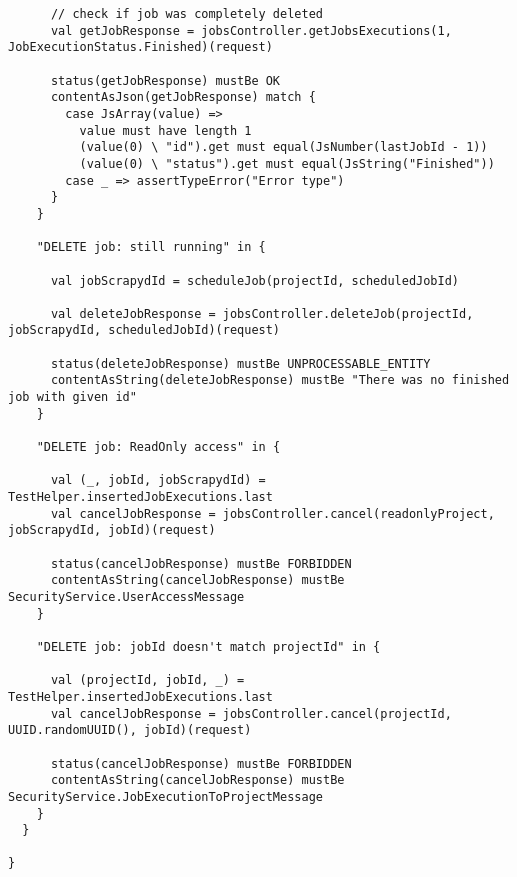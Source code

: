 \begin{lstlisting}
      // check if job was completely deleted
      val getJobResponse = jobsController.getJobsExecutions(1, JobExecutionStatus.Finished)(request)

      status(getJobResponse) mustBe OK
      contentAsJson(getJobResponse) match {
        case JsArray(value) =>
          value must have length 1
          (value(0) \ "id").get must equal(JsNumber(lastJobId - 1))
          (value(0) \ "status").get must equal(JsString("Finished"))
        case _ => assertTypeError("Error type")
      }
    }

    "DELETE job: still running" in {

      val jobScrapydId = scheduleJob(projectId, scheduledJobId)

      val deleteJobResponse = jobsController.deleteJob(projectId, jobScrapydId, scheduledJobId)(request)

      status(deleteJobResponse) mustBe UNPROCESSABLE_ENTITY
      contentAsString(deleteJobResponse) mustBe "There was no finished job with given id"
    }

    "DELETE job: ReadOnly access" in {

      val (_, jobId, jobScrapydId) = TestHelper.insertedJobExecutions.last
      val cancelJobResponse = jobsController.cancel(readonlyProject, jobScrapydId, jobId)(request)

      status(cancelJobResponse) mustBe FORBIDDEN
      contentAsString(cancelJobResponse) mustBe SecurityService.UserAccessMessage
    }

    "DELETE job: jobId doesn't match projectId" in {

      val (projectId, jobId, _) = TestHelper.insertedJobExecutions.last
      val cancelJobResponse = jobsController.cancel(projectId, UUID.randomUUID(), jobId)(request)

      status(cancelJobResponse) mustBe FORBIDDEN
      contentAsString(cancelJobResponse) mustBe SecurityService.JobExecutionToProjectMessage
    }
  }

}
\end{lstlisting}
